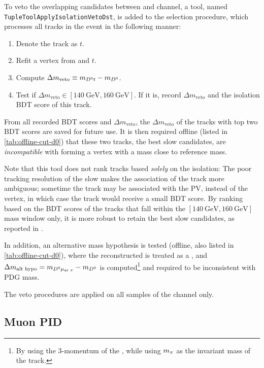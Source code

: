 To veto the overlapping candidates between \Dz and \Dstar channel,
a tool, named \texttt{TupleToolApplyIsolationVetoDst},
is added to the selection procedure, which processes all tracks
in the event in the following manner:

\begin{enumerate}
    \item Denote the track as $t$.
    \item Refit a vertex from \Dz and $t$.
    \item Compute $\Delta m_\text{veto} \equiv m_{{{D}^0} t} - m_{{D}^0}$.
    \item Test if $\Delta m_\text{veto} \in [140~\text{GeV}, 160~\text{GeV}]$.
        If it is, record $\Delta m_\text{veto}$ and the isolation BDT
        score of this track.
\end{enumerate}

From all recorded BDT scores and $\Delta m_\text{veto}$, the
$\Delta m_\text{veto}$ of the tracks with top two BDT scores are saved
for future use.
It is then required offline (listed in \cref{tab:offline-cut-d0})
that these two tracks,
the best slow \pion candidates,
are \emph{incompatible} with
forming a \Dz\pion vertex with a mass close to \Dstar reference mass.

Note that this tool does not rank tracks based \emph{solely} on the isolation:
The poor tracking resolution of the slow \pion makes the association of
the track more ambiguous; sometime the track may be associated with the PV,
instead of the \B vertex, in which case the track would receive a small BDT
score.
By ranking based on the BDT scores of the tracks that fall within the
$[140~\text{GeV}, 160~\text{GeV}]$
mass window only,
it is more robust to retain the best slow \pion candidates,
as reported in \cite{LHCb-ANA-2020-056}.

In addition, an alternative mass hypothesis is tested
(offline, also listed in \cref{tab:offline-cut-d0}), where the reconstructed
\muon is treated as a \pion,
and $\Delta m_\text{alt hypo} = m_{{{D}^0}{\mu}_\text{as {\ensuremath{\pi}}}} - m_{{D}^0}$
is computed\footnote{
    By using the 3-momentum of the \muon, while using $m_{\pi}$ as the invariant
    mass of the track.
} and required to be inconsistent with \Dstar PDG mass.

The veto procedures are applied on all samples of the \Dz channel only.


\subsection{Muon PID}
\label{ref:sel:tech:ubdt}

